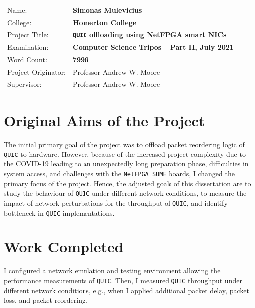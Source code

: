 \documentclass[12pt,a4paper,twoside,openright]{report}
\begin{document}
{\large
\begin{tabular}{ll}
Name:               & \bf Simonas Mulevicius                       \\
College:            & \bf Homerton College                     \\
Project Title:      & \bf \texttt{QUIC} offloading using NetFPGA smart NICs \\
Examination:        & \bf Computer Science Tripos -- Part II, July 2021  \\
Word Count:         & \bf 7996\footnotemark[1] \\
Project Originator: & Professor Andrew W. Moore                \\
Supervisor:         & Professor Andrew W. Moore                \\ 
\end{tabular}
}



\section*{Original Aims of the Project}

The initial primary goal of the project was to offload packet reordering logic of \texttt{QUIC} to hardware.
However, because of the increased project complexity due to the COVID-19 leading to an unexpectedly long preparation phase, difficulties in system access, and challenges with the \texttt{NetFPGA SUME} boards, I changed the primary focus of the project.
Hence, the adjusted goals of this dissertation are to study the behaviour of \texttt{QUIC} under different network conditions, to measure the impact of network perturbations for the throughput of \texttt{QUIC}, and identify bottleneck in \texttt{QUIC} implementations.

\section*{Work Completed}

I configured a network emulation  and testing environment allowing the performance measurements of \texttt{QUIC}.
Then, I measured \texttt{QUIC} throughput under different network conditions, e.g., when I applied additional packet delay, packet loss, and packet reordering.
\end{document}
